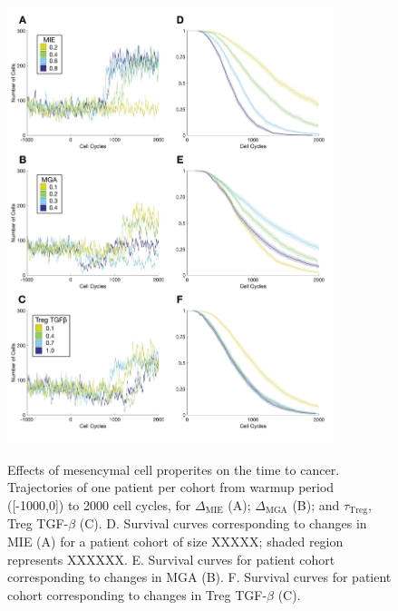 \documentclass[11pt]{article}
\begin{document}
\begin{figure}
\center
{\includegraphics[width=0.85\textwidth]{Figure3/Figure3.pdf}}
\caption{Effects of mesencymal cell properites on the time to cancer. Trajectories of one patient per cohort from warmup period ([-1000,0]) to 2000 cell cycles, for $\Delta_\text{MIE}$ (A); $\Delta_\text{MGA}$ (B); and $\tau_\text{Treg}$, Treg TGF-$\beta$ (C). 
D. Survival curves corresponding to changes in MIE (A) for a patient cohort of size XXXXX; shaded region represents XXXXXX. 
E. Survival curves for patient cohort corresponding to changes in MGA (B).
F. Survival curves for patient cohort corresponding to changes in Treg TGF-$\beta$ (C). 
}
\label{fig:FirstSurvivalCurves}
\end{figure}
\end{document}
